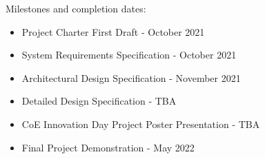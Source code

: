 Milestones and completion dates:
\begin{itemize}
  \item Project Charter First Draft - October 2021
  \item System Requirements Specification - October 2021
  \item Architectural Design Specification - November 2021
  \item Detailed Design Specification - TBA
  \item CoE Innovation Day Project Poster Presentation - TBA
  \item Final Project Demonstration - May 2022
\end{itemize}